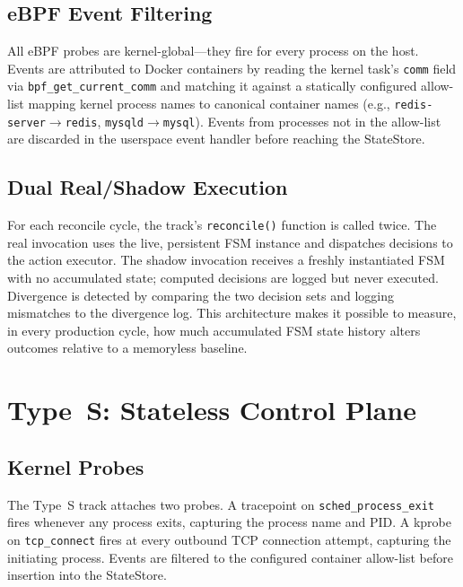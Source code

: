 \documentclass[runningheads]{llncs}
\begin{document}
\subsection{eBPF Event Filtering}

All eBPF probes are kernel-global---they fire for every process on
the host. Events are attributed to Docker containers by reading the
kernel task's \texttt{comm} field via \texttt{bpf\_get\_current\_comm}
and matching it against a statically configured allow-list mapping
kernel process names to canonical container names (e.g.,
\texttt{redis-server}$\to$\texttt{redis}, \texttt{mysqld}$\to$\texttt{mysql}).
Events from processes not in the allow-list are discarded in the
userspace event handler before reaching the StateStore.

\subsection{Dual Real/Shadow Execution}

For each reconcile cycle, the track's \texttt{reconcile()} function
is called twice. The real invocation uses the live, persistent FSM
instance and dispatches decisions to the action executor. The shadow
invocation receives a freshly instantiated FSM with no accumulated
state; computed decisions are logged but never executed. Divergence is
detected by comparing the two decision sets and logging mismatches to
the divergence log. This architecture makes it possible to measure, in
every production cycle, how much accumulated FSM state history alters
outcomes relative to a memoryless baseline.

\section{Type~S: Stateless Control Plane}
\label{sec:types}

\subsection{Kernel Probes}

The Type~S track attaches two probes. A tracepoint on
\texttt{sched\_process\_exit} fires whenever any process exits,
capturing the process name and PID. A kprobe on \texttt{tcp\_connect}
fires at every outbound TCP connection attempt, capturing the initiating
process. Events are filtered to the configured container allow-list
before insertion into the StateStore.
\end{document}
